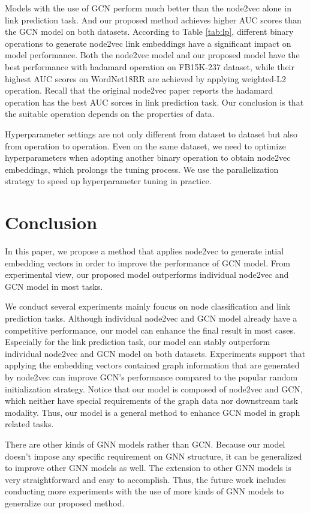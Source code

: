 \documentclass[sigconf]{acmart}
\begin{document}
Models with the use of GCN perform much better than the node2vec alone in link prediction task. And our proposed method achieves higher AUC scores than the GCN model on both datasets. According to Table \ref{tab:lp}, different binary operations to generate node2vec link embeddings have a significant impact on model performance. Both the node2vec model and our proposed model have the best performance with hadamard operation on FB15K-237 dataset, while their highest AUC scores on WordNet18RR are achieved by applying weighted-L2 operation. Recall that the original node2vec paper \cite{node2vec} reports the hadamard operation has the best AUC sorces in link prediction task. Our conclusion is that the suitable operation depends on the properties of data. 

Hyperparameter settings are not only different from dataset to dataset but also from operation to operation. Even on the same dataset, we need to optimize hyperparameters when adopting another binary operation to obtain node2vec embeddings, which prolongs the tuning process. We use the parallelization strategy to speed up hyperparameter tuning in practice.

\section{Conclusion}
In this paper, we propose a method that applies node2vec to generate intial embedding vectors in order to improve the performance of GCN model. From experimental view, our proposed model outperforms individual node2vec and GCN model in most tasks. 

We conduct several experiments mainly foucus on node classification and link prediction tasks. Although individual node2vec and GCN model already have a competitive performance, our model can enhance the final result in most cases. Especially for the link prediction task, our model can stably outperform individual node2vec and GCN model on both datasets. Experiments support that applying the embedding vectors contained graph information that are generated by node2vec can improve GCN's performance compared to the popular random initialization strategy. Notice that our model is composed of node2vec and GCN, which neither have special requirements of the graph data nor downstream task modality. Thus, our model is a general method to enhance GCN model in graph related tasks.

There are other kinds of GNN models rather than GCN. Because our model doesn't impose any specific requirement on GNN structure, it can be generalized to improve other GNN models as well. The extension to other GNN models is very straightforward and easy to accomplish. Thus, the future work includes conducting more experiments with the use of more kinds of GNN models to generalize our proposed method.
\end{document}

